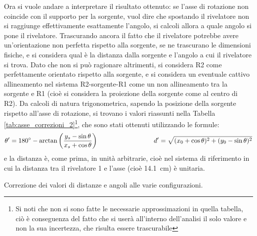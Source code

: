 Ora si vuole andare a interpretare il risultato ottenuto: se l'asse di rotazione non coincide con il supporto per la sorgente, vuol dire che spostando il rivelatore non
si raggiunge effettivamente esattamente l'angolo, si calcoli allora a quale angolo si pone il rivelatore. Trascurando ancora il fatto che il rivelatore potrebbe avere
un'orientazione non perfetta rispetto alla sorgente, se ne trascurano le dimensioni fisiche, e si considera qual è la distanza dalla sorgente e l'angolo a cui il rivelatore
si trova. Dato che non si può ragionare altrimenti, si considera R2 come perfettamente orientato rispetto alla sorgente, e si considera un eventuale cattivo allineamento
nel sistema R2-sorgente-R1 come un non allineamento tra la sorgente e R1 (cioè si considera la proiezione della sorgente come al centro di R2). Da calcoli di natura
trigonometrica, sapendo la posizione della sorgente rispetto all'asse di rotazione, si trovano i valori riassunti nella Tabella \ref{tab:asse_correzioni_2}\footnote{Si noti
che non si sono fatte le necessarie approssimazioni in quella tabella, ciò è conseguenza del fatto che si userà all'interno dell'analisi il solo valore e non la sua incertezza, che risulta essere trascurabile}, che sono stati ottenuti utilizzando le formule:
$$\theta' = 180^\circ -\arctan\left(\frac{y_s-\sin\theta}{x_s+\cos\theta}\right) \hspace{3 cm} d' = \sqrt{(x_0+\cos\theta)^2+(y_0-\sin\theta)^2}$$
e la distanza è, come prima, in unità arbitrarie, cioè nel sistema di riferimento in cui la distanza tra il rivelatore 1 e l'asse (cioè 14.1~cm) è unitaria.
%
\begin{table}[h]
	\centering
	
	\caption{Correzione dei valori di distanze e angoli alle varie configurazioni.}
	\label{tab:asse_correzioni_2}
\end{table}
%
